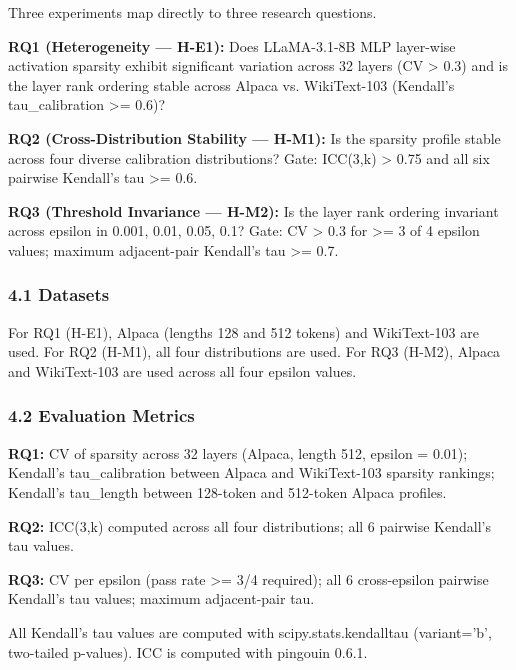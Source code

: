 
Three experiments map directly to three research questions.

\textbf{RQ1 (Heterogeneity --- H-E1):} Does LLaMA-3.1-8B MLP layer-wise activation sparsity exhibit significant variation across 32 layers (CV > 0.3) and is the layer rank ordering stable across Alpaca vs. WikiText-103 (Kendall's tau\_calibration >= 0.6)?

\textbf{RQ2 (Cross-Distribution Stability --- H-M1):} Is the sparsity profile stable across four diverse calibration distributions? Gate: ICC(3,k) > 0.75 and all six pairwise Kendall's tau >= 0.6.

\textbf{RQ3 (Threshold Invariance --- H-M2):} Is the layer rank ordering invariant across epsilon in {0.001, 0.01, 0.05, 0.1}? Gate: CV > 0.3 for >= 3 of 4 epsilon values; maximum adjacent-pair Kendall's tau >= 0.7.

\subsubsection{4.1 Datasets}

\begin{table}[htbp]
\centering
{}
\end{table}

For RQ1 (H-E1), Alpaca (lengths 128 and 512 tokens) and WikiText-103 are used. For RQ2 (H-M1), all four distributions are used. For RQ3 (H-M2), Alpaca and WikiText-103 are used across all four epsilon values.

\subsubsection{4.2 Evaluation Metrics}

\textbf{RQ1:} CV of sparsity across 32 layers (Alpaca, length 512, epsilon = 0.01); Kendall's tau\_calibration between Alpaca and WikiText-103 sparsity rankings; Kendall's tau\_length between 128-token and 512-token Alpaca profiles.

\textbf{RQ2:} ICC(3,k) computed across all four distributions; all 6 pairwise Kendall's tau values.

\textbf{RQ3:} CV per epsilon (pass rate >= 3/4 required); all 6 cross-epsilon pairwise Kendall's tau values; maximum adjacent-pair tau.

All Kendall's tau values are computed with scipy.stats.kendalltau (variant='b', two-tailed p-values). ICC is computed with pingouin 0.6.1.

